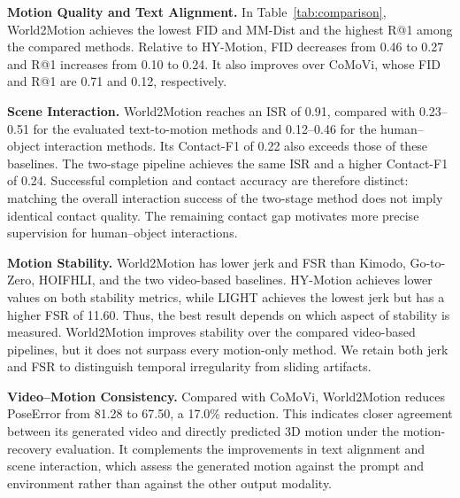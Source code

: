 \noindent\textbf{Motion Quality and Text Alignment.} In Table~\ref{tab:comparison}, World2Motion achieves the lowest FID and MM-Dist and the highest R@1 among the compared methods. Relative to HY-Motion, FID decreases from 0.46 to 0.27 and R@1 increases from 0.10 to 0.24. It also improves over CoMoVi, whose FID and R@1 are 0.71 and 0.12, respectively.

\noindent\textbf{Scene Interaction.} World2Motion reaches an ISR of 0.91, compared with 0.23--0.51 for the evaluated text-to-motion methods and 0.12--0.46 for the human--object interaction methods. Its Contact-F1 of 0.22 also exceeds those of these baselines. The two-stage pipeline achieves the same ISR and a higher Contact-F1 of 0.24. Successful completion and contact accuracy are therefore distinct: matching the overall interaction success of the two-stage method does not imply identical contact quality. The remaining contact gap motivates more precise supervision for human--object interactions.

\noindent\textbf{Motion Stability.} World2Motion has lower jerk and FSR than Kimodo, Go-to-Zero, HOIFHLI, and the two video-based baselines. HY-Motion achieves lower values on both stability metrics, while LIGHT achieves the lowest jerk but has a higher FSR of 11.60. Thus, the best result depends on which aspect of stability is measured. World2Motion improves stability over the compared video-based pipelines, but it does not surpass every motion-only method. We retain both jerk and FSR to distinguish temporal irregularity from sliding artifacts.

\noindent\textbf{Video--Motion Consistency.} Compared with CoMoVi, World2Motion reduces PoseError from 81.28 to 67.50, a 17.0\% reduction. This indicates closer agreement between its generated video and directly predicted 3D motion under the motion-recovery evaluation. It complements the improvements in text alignment and scene interaction, which assess the generated motion against the prompt and environment rather than against the other output modality.

